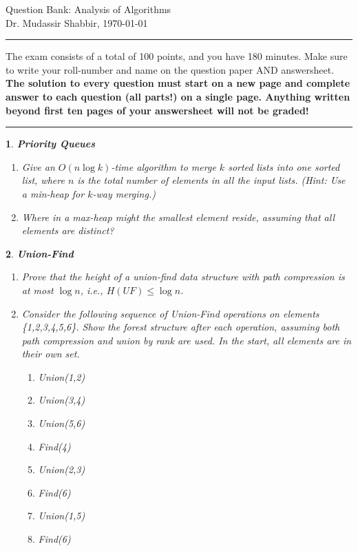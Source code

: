 \documentclass[%
addpoints]{exam}
\theoremstyle{problem}
\newtheorem{p}{}
\begin{document}
 \pagestyle{empty}
 \begin{FlushLeft}
Question Bank: Analysis of Algorithms\\Dr. Mudassir Shabbir,
\today
\end{FlushLeft}

	
\thispagestyle{myheadings}
\rule{550pt}{1.5pt}

The exam consists of a total of 100 points, and you have 180 minutes. Make sure to write your roll-number and name on the question paper AND answersheet. 
\textbf{The solution to every question must start on a new page and complete answer to each question (all parts!) on a single page. 
Anything written beyond first ten pages of your answersheet will not be graded!}

\rule{550pt}{1.5pt}

\begin{p}
    {\bf Priority Queues}
    \begin{enumerate}
        \item Give an \( O(n \log k) \)-time algorithm to merge \( k \) sorted lists into one sorted list, where \( n \) is the total number of elements in all the input lists. (Hint: Use a min-heap for \( k \)-way merging.)
        \item Where in a max-heap might the smallest element reside, assuming that all elements are distinct?
    \end{enumerate}
    \hfill
\end{p}

\begin{p}
    {\bf Union-Find}
    \begin{enumerate}
        \item Prove that the height of a union-find data structure with path compression is at most $\log n$, i.e., $H(UF) \leq \log n$.  
        \item Consider the following sequence of Union-Find operations on elements \{1,2,3,4,5,6\}. Show the forest structure after each operation, assuming both path compression and union by rank are used. In the start, all elements are in their own set.
    \begin{enumerate}
        \item Union(1,2)
        \item Union(3,4)
        \item Union(5,6)
        \item Find(4)
        \item Union(2,3)
        \item Find(6)
        \item Union(1,5)
        \item Find(6)
    \end{enumerate}
\end{enumerate}  
\hfill
\end{p}
\end{document}
